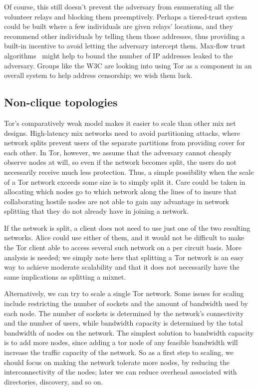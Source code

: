 \documentclass{llncs}
\begin{document}
Of course, this still doesn't prevent the adversary
from enumerating all the volunteer relays and blocking them preemptively.
Perhaps a tiered-trust system could be built where a few individuals are
given relays' locations, and they recommend other individuals by telling them
those addresses, thus providing a built-in incentive to avoid letting the
adversary intercept them. Max-flow trust algorithms~\cite{advogato}
might help to bound the number of IP addresses leaked to the adversary. Groups
like the W3C are looking into using Tor as a component in an overall system to
help address censorship; we wish them luck.


\subsection{Non-clique topologies}

Tor's comparatively  weak model makes it easier to scale than other mix net
designs.  High-latency mix networks need to avoid partitioning attacks, where
network splits prevent users of the separate partitions from providing cover
for each other.  In Tor, however, we assume that the adversary cannot
cheaply observe nodes at will, so even if the network becomes split, the
users do not necessarily receive much less protection.
Thus, a simple possibility when the scale of a Tor network
exceeds some size is to simply split it. Care could be taken in
allocating which nodes go to which network along the lines of
\cite{casc-rep} to insure that collaborating hostile nodes are not
able to gain any advantage in network splitting that they do not
already have in joining a network.

If the network is split, 
a client does not need to use just one of the two resulting networks.
Alice could use either of them, and it would not be difficult to make
the Tor client able to access several such network on a per circuit
basis. More analysis is needed; we simply note here that splitting
a Tor network is an easy way to achieve moderate scalability and that
it does not necessarily have the same implications as splitting a mixnet.

Alternatively, we can try to scale a single Tor network.  Some issues for
scaling include restricting the number of sockets and the amount of bandwidth
used by each node.  The number of sockets is determined by the network's
connectivity and the number of users, while bandwidth capacity is determined
by the total bandwidth of nodes on the network.  The simplest solution to
bandwidth capacity is to add more nodes, since adding a tor node of any
feasible bandwidth will increase the traffic capacity of the network.  So as
a first step to scaling, we should focus on making the network tolerate more
nodes, by reducing the interconnectivity of the nodes; later we can reduce
overhead associated with directories, discovery, and so on.
\end{document}
